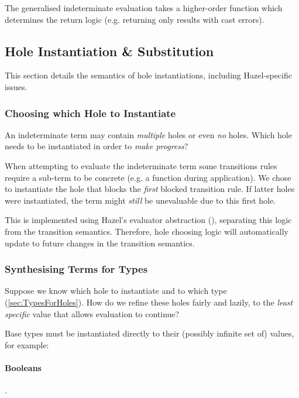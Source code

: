 The generalised indeterminate evaluation takes a higher-order  function which determines the return logic (e.g. returning only results with cast errors).

\subsection{Hole Instantiation \& Substitution}\label{sec:HoleInstantiation}
This section details the semantics of hole instantiations, including Hazel-specific issues.

\subsubsection{Choosing which Hole to Instantiate}
\label{sec:ChooseHole}
An indeterminate term may contain \textit{multiple} holes or even \textit{no} holes. Which hole needs to be instantiated in order to \textit{make progress}?

When attempting to evaluate the indeterminate term some transitions rules require a sub-term to be concrete (e.g. a function during application). We chose to instantiate the hole that blocks the \textit{first} blocked transition rule. If latter holes were instantiated, the term might \textit{still} be unevaluable due to this first hole.

This is implemented using Hazel's evaluator abstraction (), separating this logic from the transition semantics. Therefore, hole choosing logic will automatically update to future changes in the transition semantics.

\subsubsection{Synthesising Terms for Types}
Suppose we know which hole to instantiate and to which type (\cref{sec:TypesForHoles}). How do we refine these holes fairly and lazily, to the \textit{least specific} value that allows evaluation to continue?

Base types must be instantiated directly to their (possibly infinite set of) values, for example:
\paragraph{Booleans} .
